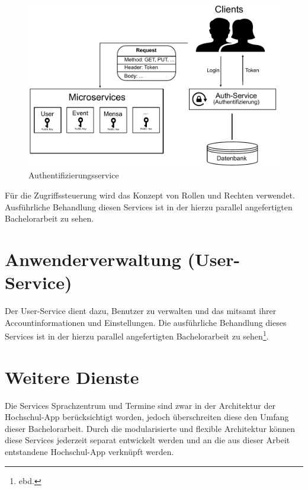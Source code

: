 \begin{figure}[H]
\centering
\includegraphics[width=\pictureWidth cm]{Bilder/Prototyp/Auth_Service_Prototype.pdf}
\caption{Authentifizierungsservice\label{fig:authservice}\protect\footnotemark}
\end{figure}

Für die Zugriffssteuerung wird das Konzept von Rollen und Rechten verwendet. Ausführliche Behandlung diesen Services ist in der hierzu parallel angefertigten Bachelorarbeit zu sehen\autocite[Vgl.][]{andreasba}.

\section{Anwenderverwaltung (User-Service)}
\label{sec:user}
Der User-Service dient dazu, Benutzer zu verwalten und das mitsamt ihrer Accountinformationen und Einstellungen. Die ausführliche Behandlung dieses Services ist in der hierzu parallel angefertigten Bachelorarbeit zu sehen\footnote{ebd.}.

\section{Weitere Dienste}
\label{sec:ausblick}
Die Services Sprachzentrum und Termine sind zwar in der Architektur der Hoch\-schul-\ac{App} berücksichtigt worden, jedoch überschreiten diese den Umfang dieser Bachelorarbeit. Durch die modularisierte und flexible Architektur können diese Services jederzeit separat entwickelt werden und an die aus dieser Arbeit entstandene Hoch\-schul-\ac{App} verknüpft werden.
